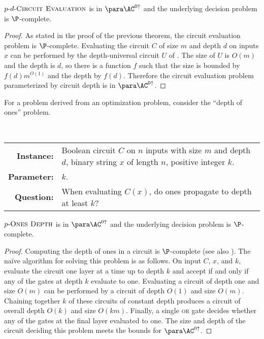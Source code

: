 \documentclass{article}
\newcommand{\dash}{\textnormal{-}}
\begin{document}
\begin{theorem}\label{thm:cvpdepth}
  $p \dash d \dash \textsc{Circuit Evaluation}$ is in $\para \AC^{0 \uparrow}$ and the underlying decision problem is $\P$-complete.
\end{theorem}
\begin{proof}
  As stated in the proof of the previous theorem, the circuit evaluation problem is $\P$-complete.
  Evaluating the circuit $C$ of size $m$ and depth $d$ on inputs $x$ can be performed by the depth-universal circuit $U$ of \autocite{ch85}.
  The size of $U$ is $O(m)$ and the depth is $d$, so there is a function $f$ such that the size is bounded by $f(d) m^{O(1)}$ and the depth by $f(d)$.
  Therefore the circuit evaluation problem parameterized by circuit depth is in $\para \AC^{0 \uparrow}$.
\end{proof}

For a problem derived from an optimization problem, consider the ``depth of ones'' problem.

\begin{definition}[$p \dash \textsc{Ones Depth}$]
  \mbox{} \\
  \begin{tabular}{r p{9.2cm}}
    \textbf{Instance:} & Boolean circuit $C$ on $n$ inputs with size $m$ and depth $d$, binary string $x$ of length $n$, positive integer $k$. \\
    \textbf{Parameter:} & $k$. \\
    \textbf{Question:} & When evaluating $C(x)$, do ones propagate to depth at least $k$?
  \end{tabular}
\end{definition}

\begin{theorem}
  $p \dash \textsc{Ones Depth}$ is in $\para \AC^{0 \uparrow}$ and the underlying decision problem is $\P$-complete.
\end{theorem}
\begin{proof}
  Computing the depth of ones in a circuit is $\P$-complete \autocite{ks88} (see also \autocite[Problem~A.1.10]{ghr95}).
  The naïve algorithm for solving this problem is as follows.
  On input $C$, $x$, and $k$, evaluate the circuit one layer at a time up to depth $k$ and accept if and only if any of the gates at depth $k$ evaluate to one.
  Evaluating a circuit of depth one and size $O(m)$ can be performed by a circuit of depth $O(1)$ and size $O(m)$.
  Chaining together $k$ of these circuits of constant depth produces a circuit of overall depth $O(k)$ and size $O(k m)$.
  Finally, a single \textsc{or} gate decides whether any of the gates at the final layer evaluated to one.
  The size and depth of the circuit deciding this problem meets the bounds for $\para \AC^{0\uparrow}$.
\end{proof}
\end{document}
